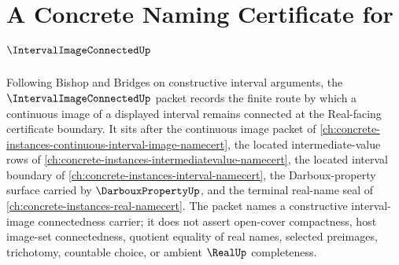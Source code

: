 \chapter{A Concrete Naming Certificate for $\IntervalImageConnectedUp$}
\label{ch:concrete-instances-interval-image-connected-namecert}

Following Bishop and Bridges on constructive interval arguments, the $\IntervalImageConnectedUp$ packet records the finite route by which a continuous image of a displayed interval remains connected at the Real-facing certificate boundary. It sits after the continuous image packet of \autoref{ch:concrete-instances-continuous-interval-image-namecert}, the located intermediate-value rows of \autoref{ch:concrete-instances-intermediatevalue-namecert}, the located interval boundary of \autoref{ch:concrete-instances-interval-namecert}, the Darboux-property surface carried by $\DarbouxPropertyUp$, and the terminal real-name seal of \autoref{ch:concrete-instances-real-namecert}. The packet names a constructive interval-image connectedness carrier; it does not assert open-cover compactness, host image-set connectedness, quotient equality of real names, selected preimages, trichotomy, countable choice, or ambient $\RealUp$ completeness.

